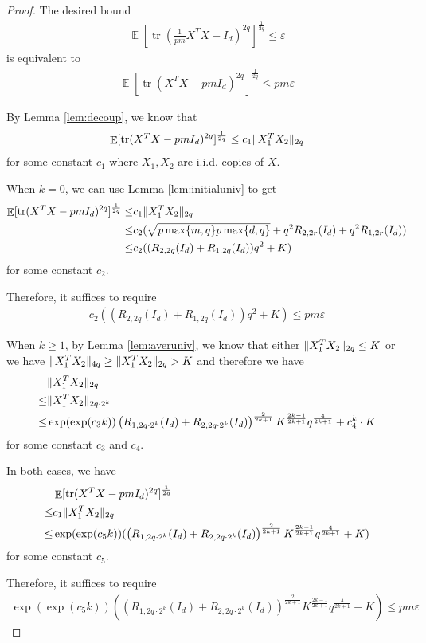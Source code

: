 \documentclass[11pt]{amsart}
\numberwithin{equation}{section}
\numberwithin{equation}{section}
\DeclareMathOperator{\E}{\mathbb{E}}
\DeclareMathOperator*{\tr}{tr}
\DeclarePairedDelimiter{\norm}{\lVert}{\rVert}
\begin{document}
\begin{proof}
The desired bound
\begin{align*}
    \E[\tr(\frac{1}{pm}X^TX - I_d)^{2q}]^\frac{1}{2q} \leq  \varepsilon
\end{align*}
is equivalent to
\begin{align*}
    \E[\tr(X^TX - pmI_d)^{2q}]^\frac{1}{2q} \leq  pm\varepsilon
\end{align*}

By Lemma \ref{lem:decoup}, we know that
\begin{align*}
    \E[\tr(X^TX - pmI_d)^{2q}]^\frac{1}{2q} \le c_1 \norm{X_1^TX_2}_{2q}
\end{align*}
for some constant $c_1$ where $X_1,X_2$ are i.i.d. copies of $X$.

When $k=0$, we can use Lemma \ref{lem:initialuniv} to get
\begin{align*}
    \E[\tr(X^TX - pmI_d)^{2q}]^\frac{1}{2q} \le &c_1 \norm{X_1^TX_2}_{2q} \\\le&  
    c_{2}(\sqrt{p\max\{m,q\}p\max\{d,q\}} + q^{2}R_{2,2r}(I_d) + q^{2}R_{1,2r}(I_d))
    \\\le&  
    c_{2}((R_{2,2q}(I_d) + R_{1,2q}(I_d))q^2+K)
\end{align*}
for some constant $c_2$.

Therefore, it suffices to require
\begin{align*}
    c_{2}((R_{2,2q}(I_d) + R_{1,2q}(I_d))q^2+K) \le pm \varepsilon
\end{align*}

When $k \ge 1$, by Lemma \ref{lem:averuniv}, we know that either $\norm{X_1^TX_2}_{2q} \le K$
or we have $\norm{X_1^TX_2}_{4q} \ge \norm{X_1^TX_2}_{2q} > K$ and therefore we have
\begin{align*}
    &\norm{X_1^TX_2}_{2q} \\\le& \norm{X_1^TX_2}_{2q \cdot 2^k} \\ \le & \exp(\exp(c_3k))\left(R_{1,2q \cdot 2^k}(I_d)+R_{2,2q \cdot 2^k}(I_d)\right)^{\frac{2}{2k+1}}K^{\frac{2k-1}{2k+1}} q^{\frac{4}{2k+1}}+c_4^k \cdot K
\end{align*}
for some constant $c_3$ and $c_4$.

In both cases, we have
\begin{align*}
    &\E[\tr(X^TX - pmI_d)^{2q}]^\frac{1}{2q} 
    \\\le& c_1 \norm{X_1^TX_2}_{2q}\\\le& \exp(\exp(c_5k))(\left(R_{1,2q \cdot 2^k}(I_d)+R_{2,2q \cdot 2^k}(I_d)\right)^{\frac{2}{2k+1}}K^{\frac{2k-1}{2k+1}} q^{\frac{4}{2k+1}}+K)
\end{align*}
for some constant $c_5$.

Therefore, it suffices to require
\begin{align*}
    \exp(\exp(c_5k))\left(\left(R_{1,2q \cdot 2^k}(I_d)+R_{2,2q \cdot 2^k}(I_d)\right)^{\frac{2}{2k+1}}K^{\frac{2k-1}{2k+1}} q^{\frac{4}{2k+1}}+K\right) \le pm \varepsilon
\end{align*}




\end{proof}
\end{document}
